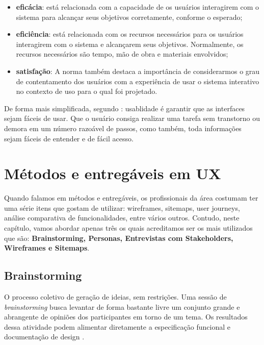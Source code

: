 \begin{itemize}
	\item \textbf{eficácia}: está relacionada com a capacidade de os usuários interagirem com o sistema para alcançar seus objetivos corretamente, conforme o esperado;
	
	\item \textbf{eficiência}:  está relacionada com os recursos necessários para os usuários
	interagirem com o sistema e alcançarem seus objetivos. Normalmente, os recursos
	necessários são tempo, mão de obra e materiais envolvidos; 
	
	\item \textbf{satisfação}: A norma também destaca
	a importância de considerarmos o grau de contentamento dos usuários com a experiência
	de usar o sistema interativo no contexto de uso para o qual foi projetado.
\end{itemize} 

De forma mais simplificada, segundo \cite{teixeira2014introduccao}: usablidade é garantir que as interfaces sejam fáceis de usar. Que o usuário consiga realizar uma tarefa sem transtorno ou demora em um número
razoável de passos, como também, toda informações sejam fáceis de entender e de fácil acesso. 

\section{Métodos e entregáveis em UX}

Quando falamos em métodos e entregáveis, os profissionais da área costumam ter uma série itens que gostam de utilizar: wireframes, sitemaps, user journeys, análise comparativa de funcionalidades, entre vários outros. Contudo, neste capítulo, vamos abordar apenas três os quais acreditamos ser os mais utilizados que são: \textbf{Brainstorming, Personas, Entrevistas com Stakeholders, Wireframes e Sitemaps}.

\subsection{Brainstorming}

O processo coletivo de geração de ideias, sem restrições. Uma sessão de \textit{brainstorming} busca
levantar de forma bastante livre um conjunto grande e abrangente de opiniões dos
participantes em torno de um tema. Os resultados dessa atividade podem alimentar
diretamente a especificação funcional e documentação de design \cite{barbosa2010IHC}.

